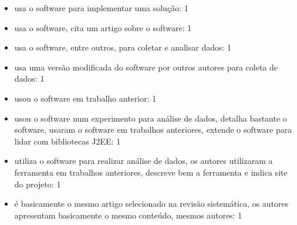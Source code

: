 \begin{itemize}
\item usa o software para implementar uma solução: 1
\item usa o software, cita um artigo sobre o software: 1
\item usa o software, entre outros, para coletar e analisar dados: 1
\item usa uma versão modificada do software por outros autores para coleta de dados: 1
\item usou o software em trabalho anterior: 1
\item usou o software num experimento para análise de dados, detalha bastante o software, usaram o software em trabalhos anteriores, extende o software para lidar com bibliotecas J2EE: 1
\item utiliza o software para realizar análise de dados, os autores utilizaram a ferramenta em trabalhos anteriores, descreve bem a ferramenta e indica site do projeto: 1
\item é basicamente o mesmo artigo selecionado na revisão sistemática, os autores apresentam basicamente o mesmo conteúdo, mesmos autores: 1
\end{itemize}

